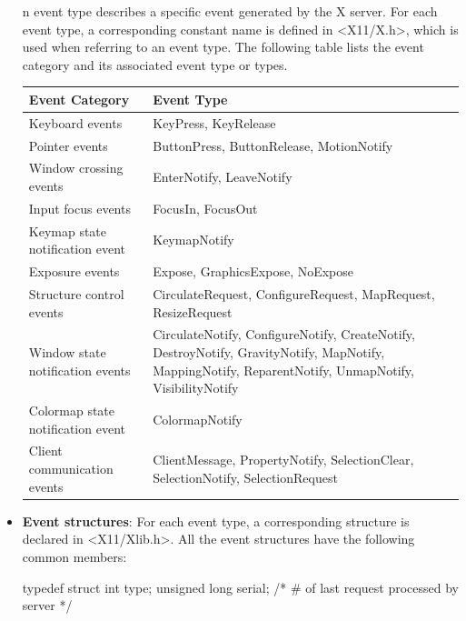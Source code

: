 \documentclass{report}
\begin{document}
\begin{itemize}
            \bigbreak \noindent 
            n event type describes a specific event generated by the X server. For each event type, a corresponding constant name is defined in <X11/X.h>, which is used when referring to an event type. The following table lists the event category and its associated event type or types. 
            \begin{center}
                \begin{tabularx}{\textwidth}{@{}XX@{}}
                    \toprule
                    \textbf{Event Category}& \textbf{Event Type} \\
                    \midrule
                    Keyboard events &KeyPress, KeyRelease\\[2ex]
                    Pointer events &ButtonPress, ButtonRelease, MotionNotify\\[2ex]
                    Window crossing events &EnterNotify, LeaveNotify\\[2ex]
                    Input focus events &FocusIn, FocusOut\\[2ex]
                    Keymap state notification event &KeymapNotify\\[2ex]
                    Exposure events &Expose, GraphicsExpose, NoExpose\\[2ex]
                    Structure control events &CirculateRequest, ConfigureRequest, MapRequest, ResizeRequest \\[2ex]
                    Window state notification events &CirculateNotify, ConfigureNotify, CreateNotify, DestroyNotify, GravityNotify, MapNotify, MappingNotify, ReparentNotify, UnmapNotify, VisibilityNotify\\[2ex]
                    Colormap state notification event& ColormapNotify\\[2ex]
                    Client communication events &ClientMessage, PropertyNotify, SelectionClear, SelectionNotify, SelectionRequest  \\
                    \bottomrule
                \end{tabularx}
            \end{center}
        \item \textbf{Event structures}: For each event type, a corresponding structure is declared in <X11/Xlib.h>. All the event structures have the following common members:
            \bigbreak \noindent 
            \begin{cppcode}
                typedef struct {
                    int type;
                    unsigned long serial;   /* # of last request processed by server */
}
\end{cppcode}
\end{itemize}
\end{document}
